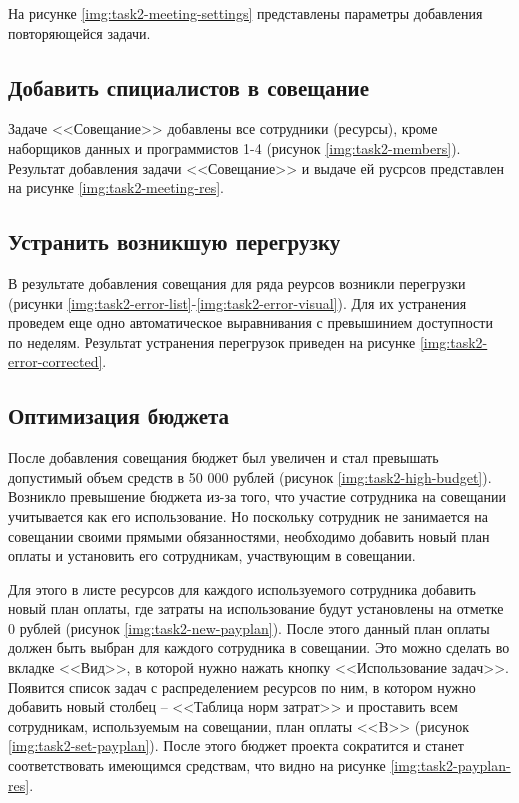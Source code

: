 На рисунке \ref{img:task2-meeting-settings} представлены параметры добавления повторяющейся задачи. 



\subsection{Добавить спициалистов в совещание}

Задаче <<Совещание>> добавлены все сотрудники (ресурсы), кроме наборщиков данных и программистов 1-4 (рисунок \ref{img:task2-members}). Результат добавления задачи <<Совещание>> и выдаче ей русрсов представлен на рисунке \ref{img:task2-meeting-res}.



\subsection{Устранить возникшую перегрузку}

В результате добавления совещания для ряда реурсов возникли перегрузки (рисунки \ref{img:task2-error-list}-\ref{img:task2-error-visual}). Для их устранения проведем еще одно автоматическое выравнивания с превышинием доступности по неделям. Результат устранения перегрузок приведен на рисунке \ref{img:task2-error-corrected}.



\subsection{Оптимизация бюджета}

После добавления совещания бюджет был увеличен и стал превышать допустимый объем средств в 50 000 рублей (рисунок \ref{img:task2-high-budget}). Возникло превышение бюджета из-за того, что участие сотрудника на совещании учитывается как его использование. Но поскольку сотрудник не занимается на совещании своими прямыми обязанностями, необходимо добавить новый план оплаты и установить его сотрудникам, участвующим в совещании. 

Для этого в листе ресурсов для каждого используемого сотрудника добавить новый план оплаты, где затраты на использование будут установлены на отметке 0 рублей (рисунок \ref{img:task2-new-payplan}). После этого данный план оплаты должен быть выбран для каждого сотрудника в совещании. Это можно сделать во вкладке <<Вид>>, в которой нужно нажать кнопку <<Использование задач>>. Появится список задач с распределением ресурсов по ним, в котором нужно добавить новый столбец -- <<Таблица норм затрат>> и проставить всем сотрудникам, используемым на совещании, план оплаты <<B>> (рисунок \ref{img:task2-set-payplan}). После этого бюджет проекта сократится и станет соответствовать имеющимся средствам, что видно на рисунке \ref{img:task2-payplan-res}.

